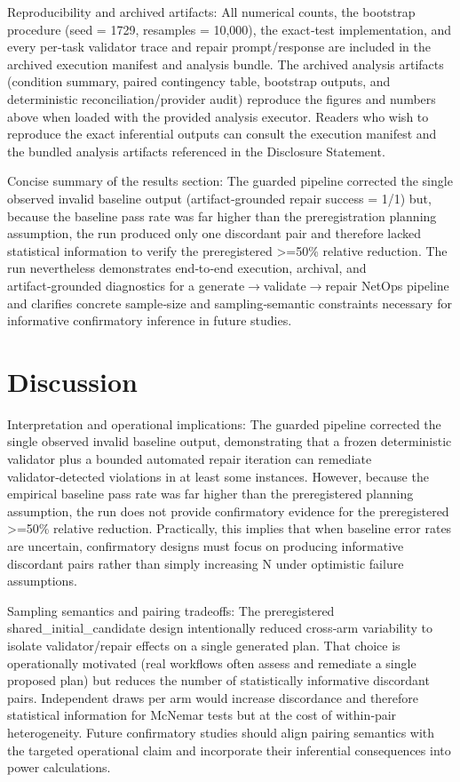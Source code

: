 \documentclass[conference]{IEEEtran}
\begin{document}
Reproducibility and archived artifacts: All numerical counts, the bootstrap procedure (seed = 1729, resamples = 10,000), the exact‑test implementation, and every per‑task validator trace and repair prompt/response are included in the archived execution manifest and analysis bundle. The archived analysis artifacts (condition summary, paired contingency table, bootstrap outputs, and deterministic reconciliation/provider audit) reproduce the figures and numbers above when loaded with the provided analysis executor. Readers who wish to reproduce the exact inferential outputs can consult the execution manifest and the bundled analysis artifacts referenced in the Disclosure Statement.

Concise summary of the results section: The guarded pipeline corrected the single observed invalid baseline output (artifact‑grounded repair success = 1/1) but, because the baseline pass rate was far higher than the preregistration planning assumption, the run produced only one discordant pair and therefore lacked statistical information to verify the preregistered >=50\% relative reduction. The run nevertheless demonstrates end‑to‑end execution, archival, and artifact‑grounded diagnostics for a generate\ensuremath{\rightarrow}validate\ensuremath{\rightarrow}repair NetOps pipeline and clarifies concrete sample‑size and sampling‑semantic constraints necessary for informative confirmatory inference in future studies.

\section{Discussion}
Interpretation and operational implications: The guarded pipeline corrected the single observed invalid baseline output, demonstrating that a frozen deterministic validator plus a bounded automated repair iteration can remediate validator‑detected violations in at least some instances. However, because the empirical baseline pass rate was far higher than the preregistered planning assumption, the run does not provide confirmatory evidence for the preregistered >=50\% relative reduction. Practically, this implies that when baseline error rates are uncertain, confirmatory designs must focus on producing informative discordant pairs rather than simply increasing N under optimistic failure assumptions.

Sampling semantics and pairing tradeoffs: The preregistered shared\_initial\_candidate design intentionally reduced cross‑arm variability to isolate validator/repair effects on a single generated plan. That choice is operationally motivated (real workflows often assess and remediate a single proposed plan) but reduces the number of statistically informative discordant pairs. Independent draws per arm would increase discordance and therefore statistical information for McNemar tests but at the cost of within‑pair heterogeneity. Future confirmatory studies should align pairing semantics with the targeted operational claim and incorporate their inferential consequences into power calculations.
\end{document}
